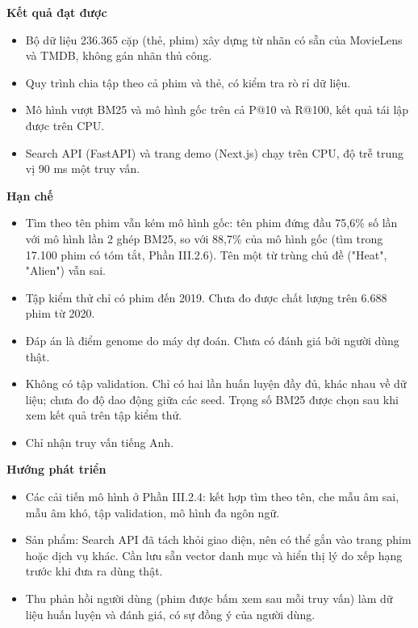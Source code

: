 \documentclass[12pt,a4paper]{article}
\providecommand{\tightlist}{\setlength{\itemsep}{0pt}\setlength{\parskip}{0pt}}
\newcommand{\lbl}[1]{\Needspace{6\baselineskip}\textbf{#1}\par\nopagebreak}
\begin{document}
\lbl{Kết quả đạt được}

\begin{itemize}
\tightlist
\item Bộ dữ liệu 236.365 cặp (thẻ, phim) xây dựng từ nhãn có sẵn của MovieLens và TMDB, không gán nhãn thủ công.
\item Quy trình chia tập theo cả phim và thẻ, có kiểm tra rò rỉ dữ liệu.
\item Mô hình vượt BM25 và mô hình gốc trên cả P@10 và R@100, kết quả tái lập được trên CPU.
\item Search API (FastAPI) và trang demo (Next.js) chạy trên CPU, độ trễ trung vị 90 ms một truy vấn.
\end{itemize}

\lbl{Hạn chế}

\begin{itemize}
\tightlist
\item Tìm theo tên phim vẫn kém mô hình gốc: tên phim đứng đầu 75,6\% số lần với mô hình lần 2 ghép BM25, so với 88,7\% của mô hình gốc (tìm trong 17.100 phim có tóm tắt, Phần III.2.6). Tên một từ trùng chủ đề ("Heat", "Alien") vẫn sai.
\item Tập kiểm thử chỉ có phim đến 2019. Chưa đo được chất lượng trên 6.688 phim từ 2020.
\item Đáp án là điểm genome do máy dự đoán. Chưa có đánh giá bởi người dùng thật.
\item Không có tập validation. Chỉ có hai lần huấn luyện đầy đủ, khác nhau về dữ liệu; chưa đo độ dao động giữa các seed. Trọng số BM25 được chọn sau khi xem kết quả trên tập kiểm thử.
\item Chỉ nhận truy vấn tiếng Anh.
\end{itemize}

\lbl{Hướng phát triển}

\begin{itemize}
\tightlist
\item Các cải tiến mô hình ở Phần III.2.4: kết hợp tìm theo tên, che mẫu âm sai, mẫu âm khó, tập validation, mô hình đa ngôn ngữ.
\item Sản phẩm: Search API đã tách khỏi giao diện, nên có thể gắn vào trang phim hoặc dịch vụ khác. Cần lưu sẵn vector danh mục và hiển thị lý do xếp hạng trước khi đưa ra dùng thật.
\item Thu phản hồi người dùng (phim được bấm xem sau mỗi truy vấn) làm dữ liệu huấn luyện và đánh giá, có sự đồng ý của người dùng.
\end{itemize}
\end{document}
